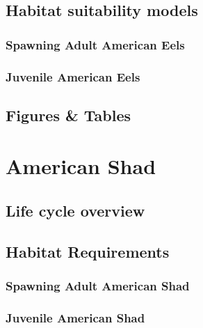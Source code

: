 \documentclass[
]{book}
\begin{document}
\hypertarget{habitat-suitability-models-1}{%
\section{Habitat suitability models}\label{habitat-suitability-models-1}}

\hypertarget{spawning-adult-american-eels-1}{%
\subsection{Spawning Adult American Eels}\label{spawning-adult-american-eels-1}}

\hypertarget{juvenile-american-eels-1}{%
\subsection{Juvenile American Eels}\label{juvenile-american-eels-1}}

\hypertarget{figures-tables-1}{%
\section{Figures \& Tables}\label{figures-tables-1}}

\hypertarget{american-shad}{%
\chapter{American Shad}\label{american-shad}}

\hypertarget{life-cycle-overview-2}{%
\section{Life cycle overview}\label{life-cycle-overview-2}}

\hypertarget{habitat-requirements-2}{%
\section{Habitat Requirements}\label{habitat-requirements-2}}

\hypertarget{spawning-adult-american-shad}{%
\subsection{Spawning Adult American Shad}\label{spawning-adult-american-shad}}

\hypertarget{juvenile-american-shad}{%
\subsection{Juvenile American Shad}\label{juvenile-american-shad}}
\end{document}
